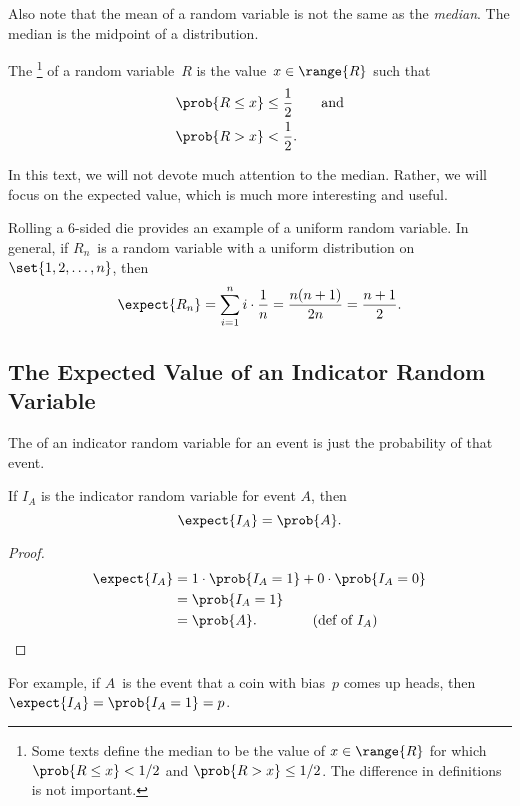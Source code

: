 Also note that the mean of a random variable is not the same as the
\emph{median}.  The median is the midpoint of a distribution.

\begin{definition}\label{def:17A2}
The \footnote{Some texts define the median to be the
  value of $x \in \range{R}$ for which $\prob{R \le x} < 1/2$ and
  $\prob{R > x} \le 1/2$.  The difference in definitions is
  not important.} of a random variable~$R$ is the value~$x \in
\range{R}$ such that
\begin{align*}
    \prob{R \le x} & \le \frac{1}{2} \qquad \text{and} \\
    \prob{R > x}   & <    \frac{1}{2}.
\end{align*}
\end{definition}

In this text, we will not devote much attention to the median.
Rather, we will focus on the expected value, which is much more
interesting and useful.

Rolling a 6-sided die provides an example of a uniform random
variable.  In general, if $R_n$~is a random variable with a uniform
distribution on~$\set{1, 2, \dots, n}$, then
\begin{align*}
\expect{R_n}    = \sum_{i = 1}^n i \cdot \frac{1}{n} %
                = \frac{n (n + 1)}{2n} %
                = \frac{n + 1}{2}.
\end{align*}

\subsection{The Expected Value of an Indicator Random Variable}

The  of an  indicator random
variable for an event is just the probability of that event.

\begin{lemma}\label{expindic}
If $I_A$ is the indicator random variable for event $A$, then
\[
\expect{I_A} = \prob{A}.
\]
\end{lemma}

\begin{proof}
\begin{align*}
\expect{I_A}
& =  1 \cdot \prob{I_A = 1} + 0 \cdot \prob{I_A = 0} \\
& = \prob{I_A = 1} \\
& =  \prob{A}. \qquad\qquad \text{(def of $I_A$)}\qedhere
\end{align*}
\end{proof}
For example, if $A$~is the event that a coin with bias~$p$ comes up
heads, then $\expect{I_A} = \prob{I_A=1} = p$.

